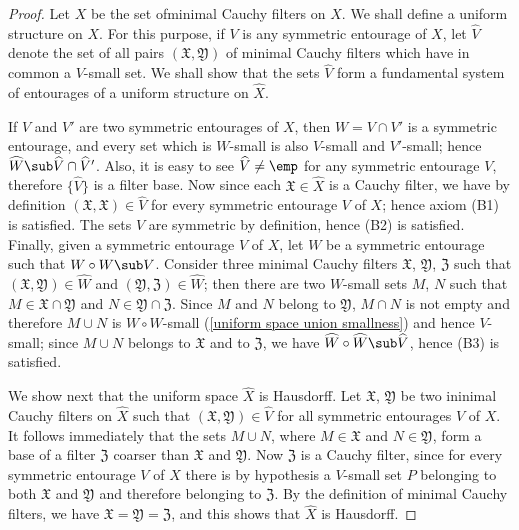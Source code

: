 \begin{proof}
Let $X$ be the set ofminimal Cauchy filters on $X$. We shall define a uniform structure on $X$. For this purpose, if $V$ is any symmetric entourage of $X$, let $\widehat{V}$ denote the set of all pairs $(\mathfrak{X},\mathfrak{Y})$ of minimal Cauchy filters which have in common a $V$-small set. We shall show that the sets $\widehat{V}$ form a fundamental system of entourages of a uniform structure on $\widehat{X}$.\par
If $V$ and $V'$ are two symmetric entourages of $X$, then $W=V\cap V'$ is a symmetric entourage, and every set which is $W$-small is also $V$-small and $V'$-small; hence $\widehat{W}\sub\widehat{V}\cap\widehat{V}'$. Also, it is easy to see $\widehat{V}\neq\emp$ for any symmetric entourage $V$, therefore $\{\widehat{V}\}$ is a filter base. Now since each $\mathfrak{X}\in\widehat{X}$ is a Cauchy filter, we have by definition $(\mathfrak{X},\mathfrak{X})\in\widehat{V}$ for every symmetric entourage $V$ of $X$; hence axiom (B1) is satisfied. The sets $V$ are symmetric by definition, hence (B2) is satisfied. Finally, given a symmetric entourage $V$ of $X$, let $W$ be a symmetric entourage such that $W\circ W\sub V$. Consider three minimal Cauchy filters $\mathfrak{X}$, $\mathfrak{Y}$, $\mathfrak{Z}$ such that $(\mathfrak{X},\mathfrak{Y})\in\widehat{W}$ and $(\mathfrak{Y},\mathfrak{Z})\in\widehat{W}$; then there are two $W$-small sets $M$, $N$ such that $M\in\mathfrak{X}\cap\mathfrak{Y}$ and $N\in\mathfrak{Y}\cap\mathfrak{Z}$. Since $M$ and $N$ belong to $\mathfrak{Y}$, $M\cap N$ is not empty and therefore $M\cup N$ is $W\circ W$-small (\cref{uniform space union smallness}) and hence $V$-small; since $M\cup N$ belongs to $\mathfrak{X}$ and to $\mathfrak{Z}$, we have $\widehat{W}\circ\widehat{W}\sub\widehat{V}$, hence (B3) is satisfied.\par
We show next that the uniform space $\widehat{X}$ is Hausdorff. Let $\mathfrak{X}$, $\mathfrak{Y}$ be two ininimal Cauchy filters on $\widehat{X}$ such that $(\mathfrak{X},\mathfrak{Y})\in\widehat{V}$ for all symmetric entourages $V$ of $X$. It follows immediately that the sets $M\cup N$, where $M\in\mathfrak{X}$ and $N\in\mathfrak{Y}$, form a base of a filter $\mathfrak{Z}$ coarser than $\mathfrak{X}$ and $\mathfrak{Y}$. Now $\mathfrak{Z}$ is a Cauchy filter, since for every symmetric entourage $V$ of $X$ there is by hypothesis a $V$-small set $P$ belonging to both $\mathfrak{X}$ and $\mathfrak{Y}$ and therefore belonging to $\mathfrak{Z}$. By the definition of minimal Cauchy filters, we have $\mathfrak{X}=\mathfrak{Y}=\mathfrak{Z}$, and this shows that $\widehat{X}$ is Hausdorff.\par

\end{proof}
